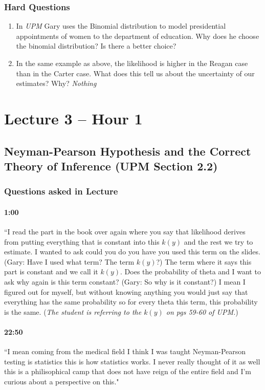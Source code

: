 \documentclass[11pt]{article}
\begin{document}
\subsubsection{Hard Questions}
\begin{enumerate}
\item In \textit{UPM} Gary uses the Binomial distribution to model presidential appointments of women to the department of education.  Why does he choose the binomial distribution?  Is there a better choice?
\item In the same example as above, the likelihood is higher in the Reagan case than in the Carter case.  What does this tell us about the uncertainty of our estimates? Why? \textit{Nothing}
\end{enumerate}

\section{Lecture 3 -- Hour 1} 
\subsection{Neyman-Pearson Hypothesis and the Correct Theory of Inference (UPM Section 2.2)}

\subsubsection{Questions asked in Lecture}

\paragraph{1:00} ``I read the part in the book over again where you say that likelihood derives from putting everything that is constant into this $k(y)$ and the rest we try to estimate.  I wanted to ask could you do you have you used this term on the slides. (Gary: Have I used what term?  The term $k(y)$?)  The term where it says this part is constant and we call it $k(y)$.  Does the probability of theta and I want to ask why again is this term constant? (Gary: So why is it constant?) I mean I figured out for myself, but without knowing anything you would just say that everything has the same probability so for every theta this term, this probability is the same.  (\emph{The student is referring to the $k(y)$ on pgs 59-60 of UPM.})

\paragraph{22:50} ``I mean coming from the medical field I think I was taught Neyman-Pearson testing is statistics this is how statistics works.  I never really thought of it as well this is a philisophical camp that does not have reign of the entire field and I'm curious about a perspective on this."
\end{document}
